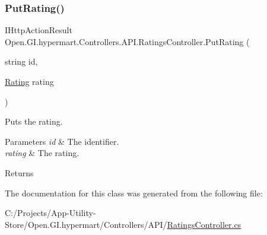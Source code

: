 \subsubsection{\texorpdfstring{Put\+Rating()}{PutRating()}}
{\footnotesize\ttfamily I\+Http\+Action\+Result Open.\+G\+I.\+hypermart.\+Controllers.\+A\+P\+I.\+Ratings\+Controller.\+Put\+Rating (\begin{DoxyParamCaption}\item[{string}]{id,  }\item[{\hyperlink{class_open_1_1_g_i_1_1hypermart_1_1_models_1_1_rating}{Rating}}]{rating }\end{DoxyParamCaption})}



Puts the rating. 


\begin{DoxyParams}{Parameters}
{\em id} & The identifier.\\
\hline
{\em rating} & The rating.\\
\hline
\end{DoxyParams}
\begin{DoxyReturn}{Returns}

\end{DoxyReturn}


The documentation for this class was generated from the following file\+:\begin{DoxyCompactItemize}
\item 
C\+:/\+Projects/\+App-\/\+Utility-\/\+Store/\+Open.\+G\+I.\+hypermart/\+Controllers/\+A\+P\+I/\hyperlink{_ratings_controller_8cs}{Ratings\+Controller.\+cs}\end{DoxyCompactItemize}
